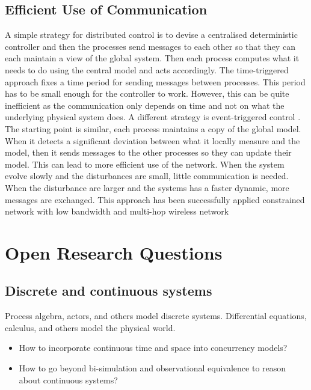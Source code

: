 \documentclass[
graybox,
envcountchap
]{svmult}
\begin{document}
\begin{bibunit}
    \subsection{Efficient Use of Communication}

   A simple strategy for distributed control is to devise a centralised deterministic controller and then the processes send messages to each other so that they can each maintain a view of the global system.
    Then each process computes what it needs to do using the central model and acts accordingly.
    The time-triggered approach fixes a time period for sending messages between processes.
    This period has to be small enough for the controller to work.
    However, this can be quite inefficient as the communication only depends on time and not on what the underlying physical system does.
    A different strategy is event-triggered control \cite{Lemmon2010}.
    The starting point is similar, each process maintains a copy of the global model.
    When it detects a significant deviation between what it locally measure and the model, then it sends messages to the other processes so they can update their model.
    This can lead to more efficient use of the network.
    When the system evolve slowly and the disturbances are small, little communication is needed.
    When the disturbance are larger and the systems has a faster dynamic, more messages are exchanged.
    This approach has been successfully applied constrained network with low bandwidth \cite{DBLP:conf/icra/TrimpeB15} and multi-hop wireless network \cite{DBLP:journals/csysl/BaumannMZT20}


\section{Open Research Questions} %

    \subsection{Discrete and continuous systems}

    Process algebra, actors, and others model discrete systems.
    Differential equations, calculus, and others model the physical world.

    \begin{itemize}
    \item How to incorporate continuous time and space into concurrency models?
    \item How to go beyond bi-simulation and observational equivalence to reason about continuous systems?
    \end{itemize}
    

\end{bibunit}
\end{document}
